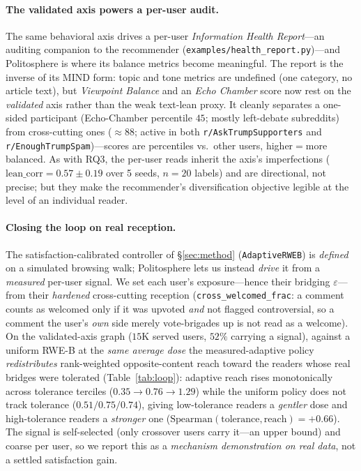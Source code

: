 \documentclass[sigconf,nonacm]{acmart}
\begin{document}
\paragraph{The validated axis powers a per-user audit.} The same behavioral axis
drives a per-user \emph{Information Health Report}---an auditing companion to the
recommender (\texttt{examples/health\_report.py})---and Politosphere is where its
balance metrics become meaningful. The report is the inverse of its MIND form: topic
and tone metrics are undefined (one category, no article text), but \emph{Viewpoint
Balance} and an \emph{Echo Chamber} score now rest on the \emph{validated} axis rather
than the weak text-lean proxy. It cleanly separates a one-sided participant
(Echo-Chamber percentile $45$; mostly left-debate subreddits) from cross-cutting ones
(${\approx}88$; active in both \texttt{r/AskTrumpSupporters} and
\texttt{r/EnoughTrumpSpam})---scores are percentiles vs.\ other users, higher${=}$more
balanced. As with RQ3, the per-user reads inherit the axis's imperfections
($\mathrm{lean\_corr}{=}0.57\pm0.19$ over 5 seeds, $n{=}20$ labels) and are directional, not
precise; but they make the recommender's diversification objective legible at the
level of an individual reader.

\paragraph{Closing the loop on real reception.} The satisfaction-calibrated
controller of \S\ref{sec:method} (\texttt{AdaptiveRWEB}) is \emph{defined} on a
simulated browsing walk; Politosphere lets us instead \emph{drive} it from a
\emph{measured} per-user signal. We set each user's exposure---hence their bridging
$\varepsilon$---from their \emph{hardened} cross-cutting reception
(\texttt{cross\_welcomed\_frac}: a comment counts as welcomed only if it was upvoted
\emph{and} not flagged controversial, so a comment the user's \emph{own} side merely
vote-brigades up is not read as a welcome). On the validated-axis graph ($15$K served
users, $52\%$ carrying a signal), against a uniform RWE-B at the \emph{same average dose}
the measured-adaptive policy \emph{redistributes} rank-weighted opposite-content reach
toward the readers whose real bridges were tolerated (Table~\ref{tab:loop}): adaptive
reach rises monotonically across tolerance terciles ($0.35\!\to\!0.76\!\to\!1.29$) while
the uniform policy does not track tolerance ($0.51/0.75/0.74$), giving low-tolerance
readers a \emph{gentler} dose and high-tolerance readers a \emph{stronger} one
($\mathrm{Spearman}(\text{tolerance},\text{reach}){=}{+}0.66$). The signal is
self-selected (only crossover users carry it---an upper bound) and coarse per user, so we
report this as a \emph{mechanism demonstration on real data}, not a settled satisfaction
gain.
\end{document}
